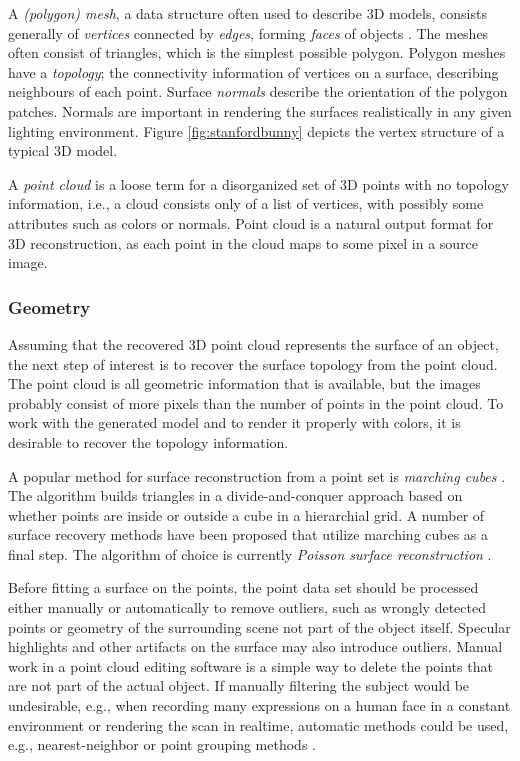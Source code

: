 A \emph{(polygon) mesh}, a data structure often used to describe 3D models, consists generally of \emph{vertices} connected by \emph{edges}, forming \emph{faces} of objects \cite{foley1990computer}.
The meshes often consist of triangles, which is the simplest possible polygon.
Polygon meshes have a \emph{topology}; the connectivity information of vertices on a surface, describing neighbours of each point.
Surface \emph{normals} describe the orientation of the polygon patches.
Normals are important in rendering the surfaces realistically in any given lighting environment.
Figure \ref{fig:stanfordbunny} depicts the vertex structure of a typical 3D model.

A \emph{point cloud} is a loose term for a disorganized set of 3D points with no topology information, i.e., a cloud consists only of a list of vertices, with possibly some attributes such as colors or normals.
Point cloud is a natural output format for 3D reconstruction, as each point in the cloud maps to some pixel in a source image.


\subsubsection{Geometry} %

Assuming that the recovered 3D point cloud represents the surface of an object, the next step of interest is to recover the surface topology from the point cloud.
The point cloud is all geometric information that is available, but the images probably consist of more pixels than the number of points in the point cloud.
To work with the generated model and to render it properly with colors, it is desirable to recover the topology information.

A popular method for surface reconstruction from a point set is \emph{marching cubes} \cite{lorensen1987marching}.
The algorithm builds triangles in a divide-and-conquer approach based on whether points are inside or outside a cube in a hierarchial grid.
A number of surface recovery methods have been proposed that utilize marching cubes as a final step.
The algorithm of choice is currently \emph{Poisson surface reconstruction} \cite{kazhdan2006poisson,kazhdan2013screened}.

Before fitting a surface on the points, the point data set should be processed either manually or automatically to remove outliers, such as wrongly detected points or geometry of the surrounding scene not part of the object itself.
Specular highlights and other artifacts on the surface may also introduce outliers.
Manual work in a point cloud editing software is a simple way to delete the points that are not part of the actual object.
If manually filtering the subject would be undesirable, e.g., when recording many expressions on a human face in a constant environment or rendering the scan in realtime, automatic methods could be used, e.g., nearest-neighbor or point grouping methods \cite{pcl}.

